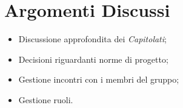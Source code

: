 
\section{Argomenti Discussi}
	\begin{itemize}
		\item Discussione approfondita dei \textit{Capitolati\glos};
		\item Decisioni riguardanti norme di progetto;
		\item Gestione incontri con i membri del gruppo;
		\item Gestione ruoli.
	\end{itemize}
